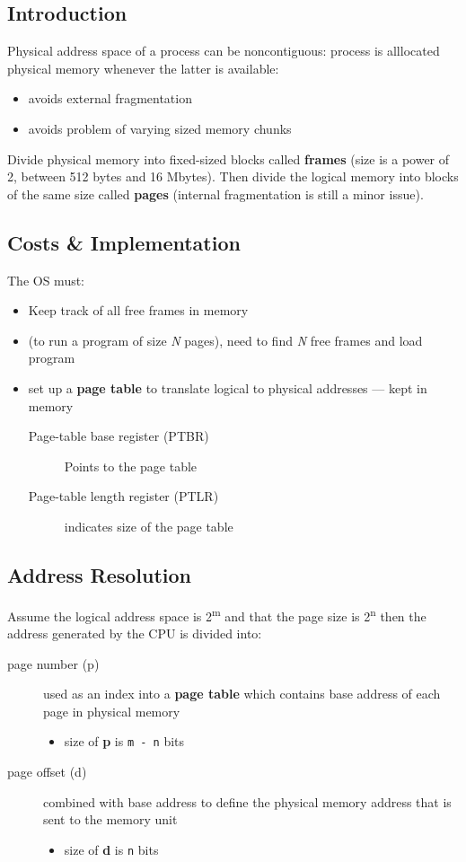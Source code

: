 \documentclass[11pt]{article}
\begin{document}
\subsection{Introduction}
\label{sec:org2537079}
Physical address space of a process can be noncontiguous: process is alllocated physical memory whenever the latter is available:
\begin{itemize}
\item avoids external fragmentation
\item avoids problem of varying sized memory chunks
\end{itemize}
Divide physical memory into fixed-sized blocks called \textbf{frames} (size is a power of 2, between 512 bytes and 16 Mbytes).
Then divide the logical memory into blocks of the same size called \textbf{pages} (internal fragmentation is still a minor issue).
\subsection{Costs \& Implementation}
\label{sec:org99ea956}
The OS must:
\begin{itemize}
\item Keep track of all free frames in memory
\item (to run a program of size \emph{N} pages), need to find \emph{N} free frames and load program
\item set up a \textbf{page table} to translate logical to physical addresses --- kept in memory
\begin{description}
\item[{Page-table base register (PTBR)}] Points to the page table
\item[{Page-table length register (PTLR)}] indicates size of the page table
\end{description}
\end{itemize}
\subsection{Address Resolution}
\label{sec:org3cc3f0f}
Assume the logical address space is 2\textsuperscript{m} and that the page size is 2\textsuperscript{n} then the address generated by the CPU is divided into:
\begin{description}
\item[{page number (p)}] used as an index into a \textbf{page table} which contains base address of each page in physical memory
\begin{itemize}
\item size of \textbf{p} is \texttt{m - n} bits
\end{itemize}
\item[{page offset (d)}] combined with base address to define the physical memory address that is sent to the memory unit
\begin{itemize}
\item size of \textbf{d} is \texttt{n} bits
\end{itemize}
\end{description}
\end{document}
